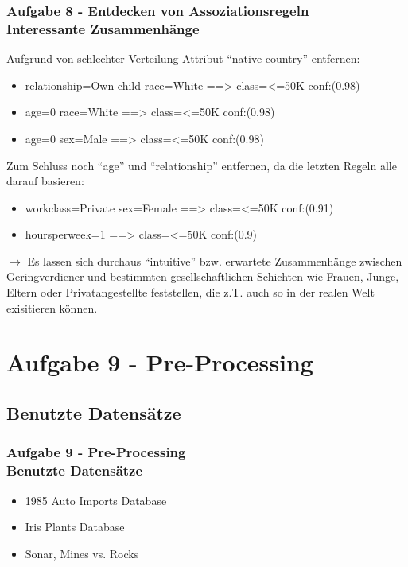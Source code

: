 \documentclass[accentcolor=tud10b,colorbacktitle,inverttitle,landscape,german,presentation,t]{tudbeamer}
\begin{document}
    \begin{frame}[t]
    \frametitle{Aufgabe 8 - Entdecken von Assoziationsregeln\\ Interessante Zusammenhänge}
        Aufgrund von schlechter Verteilung Attribut ``native-country'' entfernen:
        \begin{itemize}
            \item relationship=Own-child race=White ==> class=<=50K conf:(0.98)
            \item age=0 race=White ==> class=<=50K conf:(0.98)
            \item age=0 sex=Male ==> class=<=50K conf:(0.98)
        \end{itemize}
        Zum Schluss noch ``age'' und ``relationship'' entfernen, da die letzten Regeln alle darauf basieren:
        \begin{itemize}
            \item workclass=Private sex=Female ==> class=<=50K conf:(0.91)
            \item hoursperweek=1 ==> class=<=50K conf:(0.9)
        \end{itemize}
        \vfill
        $\rightarrow$ Es lassen sich durchaus ``intuitive'' bzw. erwartete Zusammenhänge zwischen Geringverdiener und bestimmten gesellschaftlichen Schichten wie Frauen, Junge, Eltern oder Privatangestellte feststellen, die z.T. auch so in der realen Welt exisitieren können.
    \end{frame}
    
    \section{Aufgabe 9 - Pre-Processing}
    
    \subsection{Benutzte Datensätze}
    
    \begin{frame}[t]
    \frametitle{Aufgabe 9 - Pre-Processing\\ Benutzte Datensätze}
        \begin{itemize}
            \item 1985 Auto Imports Database
            \item Iris Plants Database
            \item Sonar, Mines vs. Rocks
        \end{itemize}
    \end{frame}
    
\end{document}
